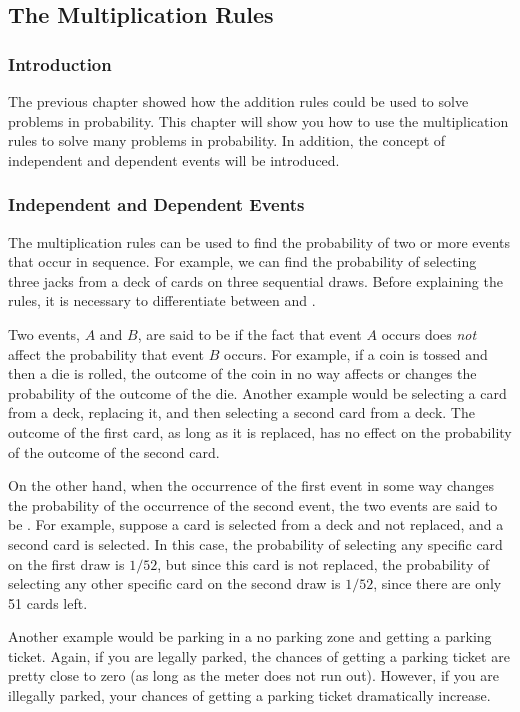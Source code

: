 \subsection{The Multiplication Rules}


\subsubsection{Introduction}
The previous chapter showed how the addition rules could be used to solve problems in probability. This chapter will show you how to use the multiplication rules to solve many problems in probability. In addition, the concept of independent and dependent events will be introduced.


\subsubsection{Independent and Dependent Events}
The multiplication rules can be used to find the probability of two or more events that occur in sequence. For example, we can find the probability of selecting three jacks from a deck of cards on three sequential draws. Before explaining the rules, it is necessary to differentiate between  and .

Two events, $A$ and $B$, are said to be  if the fact that event $A$ occurs does \emph{not} affect the probability that event $B$ occurs. For example, if a coin is tossed and then a die is rolled, the outcome of the coin in no way affects or changes the probability of the outcome of the die. Another example would be selecting a card from a deck, replacing it, and then selecting a second card from a deck. The outcome of the first card, as long as it is replaced, has no effect on the probability of the outcome of the second card.

On the other hand, when the occurrence of the first event in some way changes the probability of the occurrence of the second event, the two events are said to be . For example, suppose a card is selected from a deck and not replaced, and a second card is selected. In this case, the probability of selecting any specific card on the first draw is $1/52$, but since this card is not replaced, the probability of selecting any other specific card on the second draw is $1/52$, since there are only 51 cards left.

Another example would be parking in a no parking zone and getting a parking ticket. Again, if you are legally parked, the chances of getting a parking ticket are pretty close to zero (as long as the meter does not run out). However, if you are illegally parked, your chances of getting a parking ticket dramatically increase.


